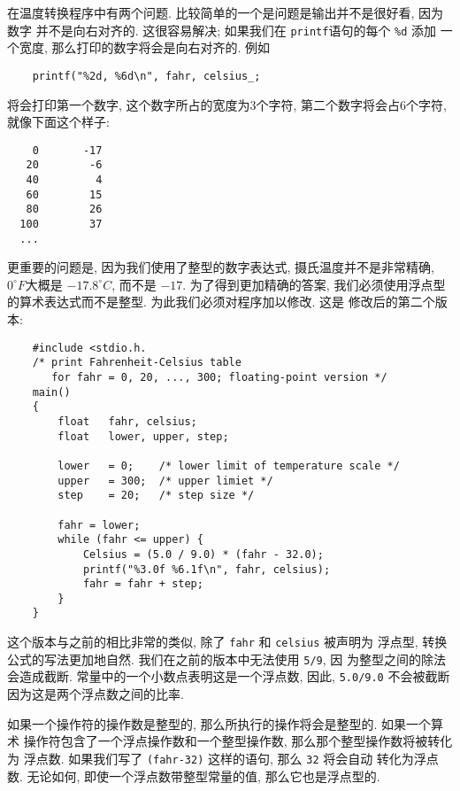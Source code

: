 \documentclass[nofonts, a4paper, oneside, 10pt]{ctexbook}
\newcommand\printf{{\texttt{printf}}}
\numberwithin{exercnt}{chapter}
\begin{document}
在温度转换程序中有两个问题. 比较简单的一个是问题是输出并不是很好看, 因为数字
并不是向右对齐的. 这很容易解决; 如果我们在 \printf 语句的每个 \verb"%d" 添加
一个宽度, 那么打印的数字将会是向右对齐的. 例如 
\begin{verbatim}
    printf("%2d, %6d\n", fahr, celsius_;
\end{verbatim}
将会打印第一个数字, 这个数字所占的宽度为3个字符, 第二个数字将会占6个字符, 
就像下面这个样子:
\begin{verbatim}
    0       -17 
   20        -6 
   40         4 
   60        15 
   80        26 
  100        37 
  ...
\end{verbatim}
更重要的问题是, 因为我们使用了整型的数字表达式, 摄氏温度并不是非常精确, 
$0^\circ F$大概是 $-17.8^\circ C$, 而不是 $-17$. 为了得到更加精确的答案,
我们必须使用浮点型的算术表达式而不是整型. 为此我们必须对程序加以修改. 这是 
修改后的第二个版本:
\begin{verbatim}
    #include <stdio.h.
    /* print Fahrenheit-Celsius table 
       for fahr = 0, 20, ..., 300; floating-point version */
    main()
    {
        float   fahr, celsius;
        float   lower, upper, step;

        lower   = 0;    /* lower limit of temperature scale */
        upper   = 300;  /* upper limiet */
        step    = 20;   /* step size */

        fahr = lower;
        while (fahr <= upper) {
            Celsius = (5.0 / 9.0) * (fahr - 32.0);
            printf("%3.0f %6.1f\n", fahr, celsius);
            fahr = fahr + step;
        }
    }
\end{verbatim}
这个版本与之前的相比非常的类似, 除了 \verb"fahr" 和 \verb"celsius" 被声明为
浮点型, 转换公式的写法更加地自然. 我们在之前的版本中无法使用 \verb"5/9", 因
为整型之间的除法会造成截断. 常量中的一个小数点表明这是一个浮点数, 因此, 
\verb"5.0/9.0" 不会被截断因为这是两个浮点数之间的比率.

如果一个操作符的操作数是整型的, 那么所执行的操作将会是整型的. 如果一个算术
操作符包含了一个浮点操作数和一个整型操作数, 那么那个整型操作数将被转化为
浮点数. 如果我们写了 \verb"(fahr-32)" 这样的语句, 那么 \verb"32" 将会自动
转化为浮点数. 无论如何, 即使一个浮点数带整型常量的值, 那么它也是浮点型的.
\end{document}
